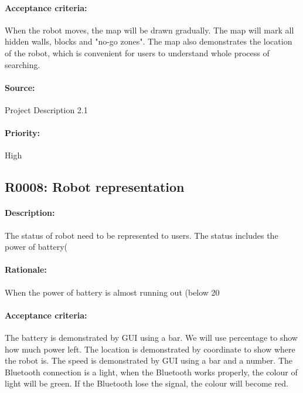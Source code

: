 \documentclass[11pt, a4paper]{report}
\begin{document}
\paragraph{Acceptance criteria:}
When the robot moves, the map will be drawn gradually. The map will mark all hidden walls, blocks and "no-go zones". The map also demonstrates the location of the robot, which is convenient for users to understand whole process of searching.
\paragraph{Source:}
Project Description 2.1
\paragraph{Priority:}
High



\subsection{R0008: Robot representation}
\paragraph{Description:}
The status of robot need to be represented to users. The status includes the power of battery(%
\paragraph{Rationale:}
When the power of battery is almost running out (below 20%
\paragraph{Acceptance criteria:}
The battery is demonstrated by GUI using a bar. We will use percentage to show how much power left. The location is demonstrated by coordinate to show where the robot is. 
The speed is demonstrated by GUI using a bar and a number. 
The Bluetooth connection is a light, when the Bluetooth works properly, the colour of  light will be green. If the Bluetooth lose the signal, the colour will become red.
\end{document}
